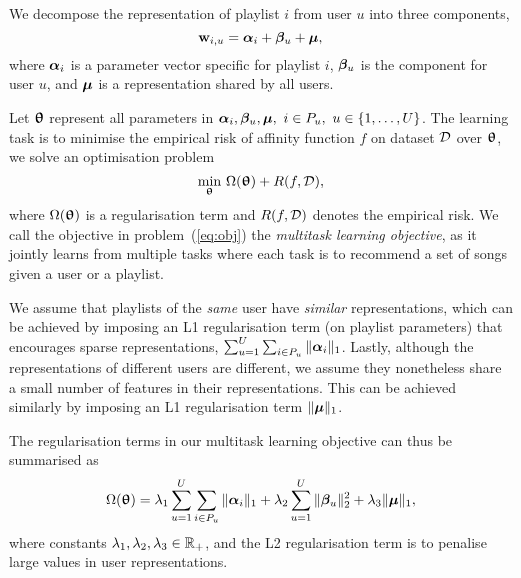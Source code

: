 We decompose the representation of playlist $i$ from user $u$ %
into three components, \ie
$$
\mathbf{w}_{i,u} = {\bm{\alpha}}_i + {\bm{\beta}}_u + \bm{\mu},
$$
where ${\bm{\alpha}}_i$ is a parameter vector specific for playlist $i$,
${\bm{\beta}}_u$ is the component for user $u$,
and $\bm{\mu}$ is a representation shared by all users.

Let ${\bm{\uptheta}}$ represent all parameters in $\alphabm_i, \betabm_u, \bmu, \ i \in P_u, \ u \in \{1,\dots,U\}$.
The learning task is to minimise the empirical risk of affinity function $f$ on dataset $\mathcal{D}$ over ${\bm{\uptheta}}$,
\ie we solve an optimisation problem
\begin{equation}
\label{eq:obj}
\min_{{\bm{\uptheta}}} \, \Omega({\bm{\uptheta}}) + R(f, \mathcal{D}),
\end{equation}
where $\Omega({\bm{\uptheta}})$ is a regularisation term and $R(f, \mathcal{D})$ denotes the empirical risk.
We call the objective in problem~(\ref{eq:obj}) the {\it multitask learning objective},
as it jointly learns from multiple tasks where each task is to recommend a set of songs given a user or a playlist.

We assume that playlists of the \emph{same} user have \emph{similar} representations,
which can be achieved by imposing an L1 regularisation term (on playlist parameters)
that encourages sparse representations, \ie $\sum_{u=1}^U \sum_{i \in P_u} \| {\bm{\alpha}}_i \|_1$.
Lastly, although the representations of different users are different,
we assume they nonetheless share a small number of features in their representations.
This can be achieved similarly by imposing an %
L1 regularisation term $\| \bm{\mu} \|_1$.

The regularisation terms in our multitask learning objective can thus be summarised as
\begin{equation}
\label{eq:reg}
\Omega({\bm{\uptheta}}) = \lambda_1 \sum_{u=1}^U \sum_{i \in P_u} \|{\bm{\alpha}}_i\|_1 + \lambda_2 \sum_{u=1}^U \|{\bm{\beta}}_u\|_2^2 + \lambda_3 \| \bm{\mu} \|_1,
\end{equation}
where constants $\lambda_1, \lambda_2, \lambda_3 \in \mathbb{R}_+$,
and the  L2 regularisation term is to penalise large values in user representations.

